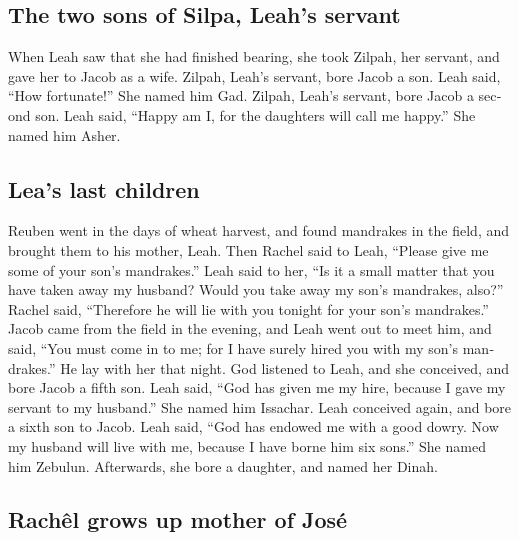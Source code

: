 \begin{paracol}{2}
\begin{otherlanguage}{english}
\hypertarget{the-two-sons-of-silpa-leahs-servant}{%
\subsection{The two sons of Silpa, Leah's
servant}\label{the-two-sons-of-silpa-leahs-servant}}

 When Leah saw that she had finished bearing, she took
Zilpah, her servant, and gave her to Jacob as a wife. 
Zilpah, Leah's servant, bore Jacob a son.  Leah said,
``How fortunate!'' She named him Gad.  Zilpah, Leah's
servant, bore Jacob a second son.  Leah said, ``Happy am
I, for the daughters will call me happy.'' She named him Asher.

\hypertarget{leas-last-children}{%
\subsection{Lea's last children}\label{leas-last-children}}

 Reuben went in the days of wheat harvest, and found
mandrakes in the field, and brought them to his mother, Leah. Then
Rachel said to Leah, ``Please give me some of your son's mandrakes.''
 Leah said to her, ``Is it a small matter that you have
taken away my husband? Would you take away my son's mandrakes, also?''
Rachel said, ``Therefore he will lie with you tonight for your son's
mandrakes.''  Jacob came from the field in the evening,
and Leah went out to meet him, and said, ``You must come in to me; for I
have surely hired you with my son's mandrakes.'' He lay with her that
night.  God listened to Leah, and she conceived, and bore
Jacob a fifth son.  Leah said, ``God has given me my
hire, because I gave my servant to my husband.'' She named him Issachar.
 Leah conceived again, and bore a sixth son to Jacob.
 Leah said, ``God has endowed me with a good dowry. Now
my husband will live with me, because I have borne him six sons.'' She
named him Zebulun.  Afterwards, she bore a daughter, and
named her Dinah.

\hypertarget{rachuxeal-grows-up-mother-of-josuxe9}{%
\subsection{Rachêl grows up mother of
José}\label{rachuxeal-grows-up-mother-of-josuxe9}}


\end{otherlanguage}
\end{paracol}
